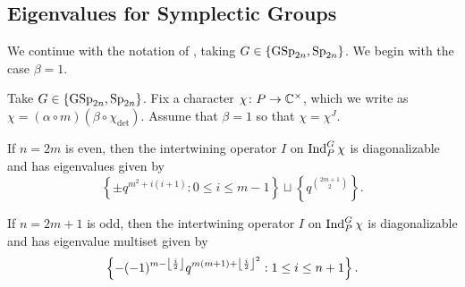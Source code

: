 \subsection{Eigenvalues for Symplectic Groups}
We continue with the notation of , taking $G\in\{\mathrm{GSp}_{2n},\mathrm{Sp}_{2n}\}$. We begin with the case $\beta=1$.
\begin{theorem}
    Take $G\in\{\mathrm{GSp}_{2n},\mathrm{Sp}_{2n}\}$. Fix a character $\chi\colon P\to\mathbb C^\times$, which we write as $\chi=(\alpha\circ m)(\beta\circ\chi_{\det})$. Assume that $\beta=1$ so that $\chi=\chi^J$.
    \begin{listalph}
        \item If $n=2m$ is even, then the intertwining operator $I$ on $\operatorname{Ind}_P^G\chi$ is diagonalizable and has eigenvalues given by
        \[\left\{\pm q^{m^2+i(i+1)}:0\le i\le m-1\right\}\sqcup\left\{q^{\binom{2m+1}2}\right\}.\]
        \item If $n=2m+1$ is odd, then the intertwining operator $I$ on $\operatorname{Ind}_P^G\chi$ is diagonalizable and has eigenvalue multiset given by
        \[\left\{-(-1)^{m-\left\lfloor{\frac i2}\right\rfloor}q^{m(m+1)+\left\lfloor{\frac i2}\right\rfloor^2}:1\le i\le n+1\right\}.\]
    \end{listalph}
\end{theorem}
